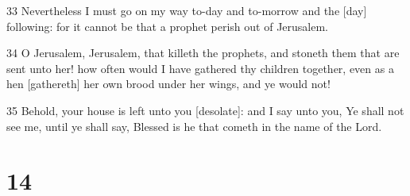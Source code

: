 \par 33 Nevertheless I must go on my way to-day and to-morrow and the [day] following: for it cannot be that a prophet perish out of Jerusalem.
\par 34 O Jerusalem, Jerusalem, that killeth the prophets, and stoneth them that are sent unto her! how often would I have gathered thy children together, even as a hen [gathereth] her own brood under her wings, and ye would not!
\par 35 Behold, your house is left unto you [desolate]: and I say unto you, Ye shall not see me, until ye shall say, Blessed is he that cometh in the name of the Lord.

\chapter{14}

